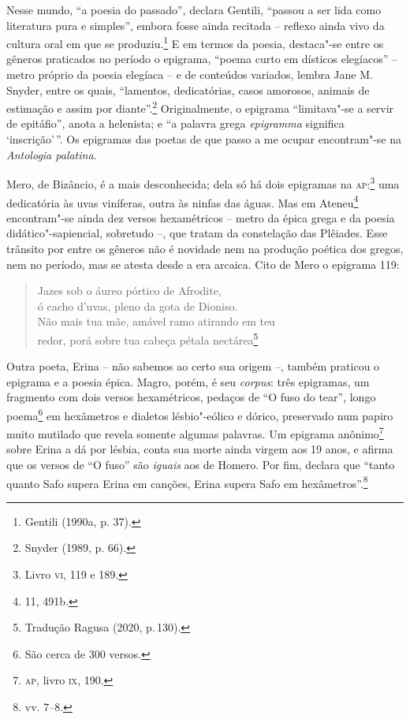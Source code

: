 Nesse mundo, “a poesia do passado”, declara Gentili, “passou a
ser lida como literatura pura e simples”, embora fosse ainda recitada -- reflexo
ainda vivo da cultura oral em que se produziu.\footnote{ Gentili (1990a, p. 37).} E em termos da poesia,
destaca"-se entre os gêneros praticados no período o epigrama, “poema curto em
dísticos elegíacos” -- metro próprio da poesia elegíaca -- e de conteúdos
variados, lembra Jane M. Snyder, entre os quais, “lamentos,
dedicatórias, casos amorosos, animais de estimação e assim por diante”.\footnote{ Snyder (1989, p. 66).}
Originalmente, o epigrama “limitava"-se a servir de epitáfio”, anota a
helenista; e “a palavra grega \textit{epigramma} significa ‘inscrição’\,”. Os
epigramas das poetas de que passo a me ocupar encontram"-se na \textit{Antologia
palatina}.

Mero, de Bizâncio, é a mais desconhecida; dela só há dois epigramas na
\textsc{ap}:\footnote{Livro \textsc{vi}, 119 e 189.} uma dedicatória às uvas viníferas,
outra às ninfas das águas. Mas em Ateneu\footnote{11, 491b.} encontram"-se ainda dez
versos hexamétricos -- metro da épica grega e da poesia didático"-sapiencial,
sobretudo --, que tratam da constelação das Plêiades. Esse trânsito por entre os
gêneros não é novidade nem na produção poética dos gregos, nem no período, mas
se atesta desde a era arcaica.
Cito de Mero o epigrama 119:

\begin{quote}
Jazes sob o áureo pórtico de Afrodite,\\
ó cacho d'uvas, pleno da gota de Dioniso.\\
Não mais tua mãe, amável ramo atirando em teu\\
redor, porá sobre tua cabeça pétala nectárea\footnote{Tradução Ragusa (2020, p.\,130).}
\end{quote}

Outra poeta, Erina -- não sabemos ao certo sua origem --, também praticou o
epigrama e a poesia épica. Magro, porém, é seu \textit{corpus}: três epigramas, um fragmento com dois versos hexamétricos, pedaços
de “O fuso do tear”, longo poema\footnote{São cerca de 300 versos.} em hexâmetros e dialetos
lésbio"-eólico e dórico, preservado num papiro muito mutilado que revela somente
algumas palavras. Um epigrama anônimo\footnote{\textsc{ap}, livro \textsc{ix}, 190.}
sobre Erina a dá por lésbia, conta sua morte ainda virgem aos 19 anos, e
afirma que os versos de “O fuso” são \textit{iguais} aos de Homero. Por fim,
declara que ``tanto quanto Safo supera Erina em canções, Erina supera
Safo em hexâmetros”.\footnote{vv. 7--8.} %


